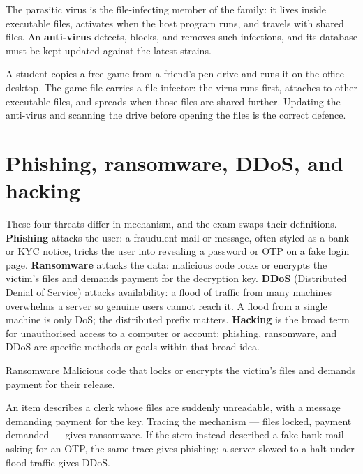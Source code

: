 The parasitic virus is the file-infecting member of the family: it lives
inside executable files, activates when the host program runs, and travels
with shared files. An \textbf{anti-virus} detects, blocks, and removes such
infections, and its database must be kept updated against the latest strains.

\begin{example}
A student copies a free game from a friend's pen drive and runs it on the
office desktop. The game file carries a file infector: the virus runs first,
attaches to other executable files, and spreads when those files are shared
further. Updating the anti-virus and scanning the drive before opening the
files is the correct defence.
\end{example}

\section{Phishing, ransomware, DDoS, and hacking}
These four threats differ in mechanism, and the exam swaps their definitions.
\textbf{Phishing} attacks the user: a fraudulent mail or message, often styled
as a bank or KYC notice, tricks the user into revealing a password or OTP on
a fake login page. \textbf{Ransomware} attacks the data: malicious code
locks or encrypts the victim's files and demands payment for the decryption
key. \textbf{DDoS} (Distributed Denial of Service) attacks availability: a
flood of traffic from many machines overwhelms a server so genuine users
cannot reach it. A flood from a single machine is only DoS; the distributed
prefix matters. \textbf{Hacking} is the broad term for unauthorised access to
a computer or account; phishing, ransomware, and DDoS are specific methods or
goals within that broad idea.

\begin{definitionbox}{Ransomware}
Malicious code that locks or encrypts the victim's files and demands payment
for their release.
\end{definitionbox}

\begin{example}
An item describes a clerk whose files are suddenly unreadable, with a message
demanding payment for the key. Tracing the mechanism --- files locked,
payment demanded --- gives ransomware. If the stem instead described a fake
bank mail asking for an OTP, the same trace gives phishing; a server slowed to
a halt under flood traffic gives DDoS.
\end{example}

